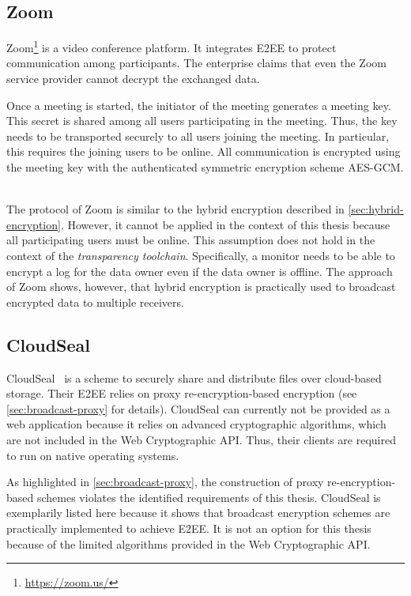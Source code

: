 \documentclass[../main.tex]{subfiles}
\begin{document}
\subsection{Zoom}
Zoom\footnote{\url{https://zoom.us/}} is a video conference platform. 
It integrates E2EE to protect communication among participants.
The enterprise claims that even the Zoom service provider cannot decrypt the exchanged data.~\cite{Blum2020}

Once a meeting is started, the initiator of the meeting generates a meeting key.
This secret is shared among all users participating in the meeting.
Thus, the key needs to be transported securely to all users joining the meeting.
In particular, this requires the joining users to be online.
All communication is encrypted using the meeting key with the authenticated symmetric encryption scheme AES-GCM.
~\cite{Isobe2021}

The protocol of Zoom is similar to the hybrid encryption described in \cref{sec:hybrid-encryption}.
However, it cannot be applied in the context of this thesis because all participating users must be online.
This assumption does not hold in the context of the \emph{transparency toolchain}.
Specifically, a monitor needs to be able to encrypt a log for the data owner even if the data owner is offline.
The approach of Zoom shows, however, that hybrid encryption is practically used to broadcast encrypted data to multiple receivers.

\subsection{CloudSeal}
CloudSeal~\cite{Xiong2012} is a scheme to securely share and distribute files over cloud-based storage.
Their E2EE relies on proxy re-encryption-based encryption (see \cref{sec:broadcast-proxy} for details).
CloudSeal can currently not be provided as a web application because it relies on advanced cryptographic algorithms, which are not included in the Web Cryptographic API.
Thus, their clients are required to run on native operating systems.~\cite{Xiong2012}

As highlighted in \cref{sec:broadcast-proxy}, the construction of proxy re-encryption-based schemes violates the identified requirements of this thesis.
CloudSeal is exemplarily listed here because it shows that broadcast encryption schemes are practically implemented to achieve E2EE.
It is not an option for this thesis because of the limited algorithms provided in the Web Cryptographic API.
\end{document}
